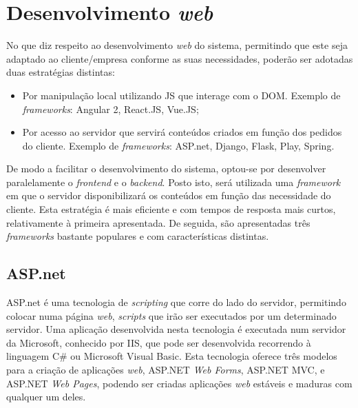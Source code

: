 

\section{Desenvolvimento \textit{web}}



No que diz respeito ao desenvolvimento \textit{web} do sistema, permitindo que este seja adaptado ao cliente/empresa conforme as suas necessidades, poderão ser adotadas duas estratégias distintas: 

\begin{itemize}
	\item Por manipulação local utilizando \ac{JS} que interage com o \ac{DOM}. Exemplo de \textit{frameworks}: Angular 2, React.JS, Vue.JS; 
	
	\item Por acesso ao servidor que servirá conteúdos criados em função dos pedidos do cliente. Exemplo de \textit{frameworks}: ASP.net, Django, Flask, Play, Spring. 
	
\end{itemize}


De modo a facilitar o desenvolvimento do sistema, optou-se por desenvolver paralelamente o \textit{frontend} e o \textit{backend}. Posto isto, será utilizada uma \textit{framework} em que o servidor disponibilizará os conteúdos em função das necessidade do cliente. Esta estratégia é mais eficiente e com tempos de resposta mais curtos, relativamente à primeira apresentada. De seguida, são apresentadas três \textit{frameworks} bastante populares e com características distintas. 




\subsection{ASP.net}


ASP.net é uma tecnologia de \textit{scripting} que corre do lado do servidor, permitindo colocar numa página \textit{web}, \textit{scripts} que irão ser executados por um determinado servidor. Uma aplicação desenvolvida nesta tecnologia é executada num servidor da Microsoft, conhecido por \ac{IIS}, que pode ser desenvolvida recorrendo à linguagem C\# ou Microsoft Visual Basic. Esta tecnologia oferece três modelos para a criação de aplicações \textit{web}, ASP.NET \textit{Web Forms}, ASP.NET \ac{MVC}, e ASP.NET \textit{Web Pages}, podendo ser criadas aplicações \textit{web} estáveis e maduras com qualquer um deles\cite{Microsoft2016}. 



